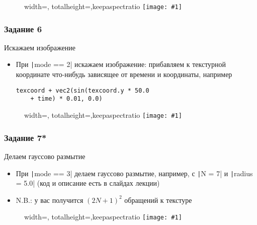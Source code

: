 \documentclass{beamer}
\newcommand{\slideimage}[1]{
  \begin{figure}
    \begin{adjustbox}{width=\textwidth, totalheight=\textheight-2\baselineskip-2\baselineskip,keepaspectratio}
      \texttt{[image: \#1]}
    \end{adjustbox}
  \end{figure}
}
\begin{document}
\begin{frame}[fragile]
\slideimage{5.png}
\end{frame}

\begin{frame}[fragile]
\frametitle{Задание 6}
Искажаем изображение
\begin{itemize}
\item При \texttt|mode == 2| искажаем изображение: прибавляем к текстурной координате что-нибудь зависящее от времени и координаты, например 
\begin{verbatim}
texcoord + vec2(sin(texcoord.y * 50.0
    + time) * 0.01, 0.0)
\end{verbatim}
\end{itemize}
\end{frame}

\begin{frame}[fragile]
\slideimage{6.png}
\end{frame}

\begin{frame}[fragile]
\frametitle{Задание 7*}
Делаем гауссово размытие
\begin{itemize}
\item При \texttt|mode == 3| делаем гауссово размытие, например, с \texttt|N = 7| и \texttt|radius = 5.0| (код и описание есть в слайдах лекции)
\item N.B.: у вас получится \begin{math}(2N+1)^2\end{math} обращений к текстуре
\end{itemize}
\end{frame}

\begin{frame}[fragile]
\slideimage{7.png}
\end{frame}
\end{document}
